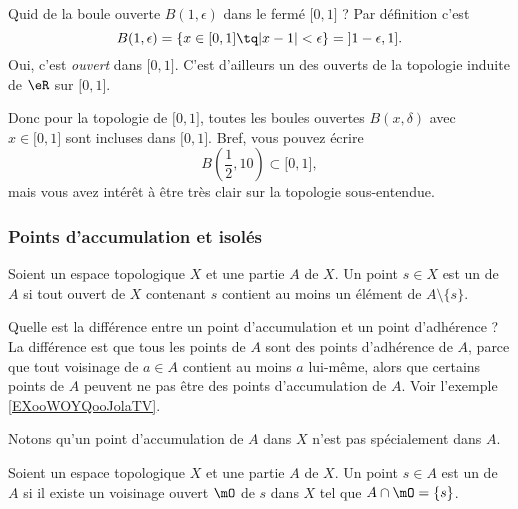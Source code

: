 \begin{example}  \label{ExKYZwYxn}
	Quid de la boule ouverte \( B(1,\epsilon)\) dans le fermé \( \mathopen[ 0 , 1 \mathclose]\) ? Par définition c'est
	\begin{equation}
		B(1,\epsilon)=\{ x\in\mathopen[ 0 , 1 \mathclose]\tq | x-1 |<\epsilon \}=\mathopen] 1-\epsilon , 1 \mathclose].
	\end{equation}
	Oui, c'est \emph{ouvert} dans \( \mathopen[ 0 , 1 \mathclose]\). C'est d'ailleurs un des ouverts de la topologie induite de \( \eR\) sur \( \mathopen[ 0 , 1 \mathclose]\).

	Donc pour la topologie de \( \mathopen[ 0 , 1 \mathclose]\), toutes les boules ouvertes \( B(x,\delta)\) avec \( x\in\mathopen[ 0 , 1 \mathclose]\) sont incluses dans \( \mathopen[ 0 , 1 \mathclose]\). Bref, vous pouvez écrire
	\begin{equation}
		B(\frac{ 1 }{2}, 10)\subset \mathopen[ 0 , 1 \mathclose],
	\end{equation}
	mais vous avez intérêt à être très clair sur la topologie sous-entendue.
\end{example}


\subsubsection{Points d'accumulation et isolés}

\begin{definition}      \label{DEFooGHUUooZKTJRi}
	Soient un espace topologique \( X\) et une partie \( A\) de \( X\). Un point \( s\in X \) est un  de \( A\) si tout ouvert de \( X\) contenant \( s\) contient au moins un élément de \( A\setminus\{ s \}\).
\end{definition}

Quelle est la différence entre un point d'accumulation et un point d'adhérence ? La différence est que tous les points de \( A\) sont des points d'adhérence de \( A\), parce que tout voisinage de \( a\in A\) contient au moins \( a\) lui-même, alors que certains points de \( A\) peuvent ne pas être des points d'accumulation de \( A\). Voir l'exemple \ref{EXooWOYQooJolaTV}.

Notons qu'un point d'accumulation de \( A\) dans \( X\) n'est pas spécialement dans \( A\).

\begin{definition}      \label{DEFooXIOWooWUKJhN}
	Soient un espace topologique \( X\) et une partie \( A\) de \( X\). Un point \( s\in A \) est un  de \( A\) si il existe un voisinage ouvert \( \mO\) de \( s\) dans \( X\) tel que \( A\cap\mO=\{ s \}\).
\end{definition}

